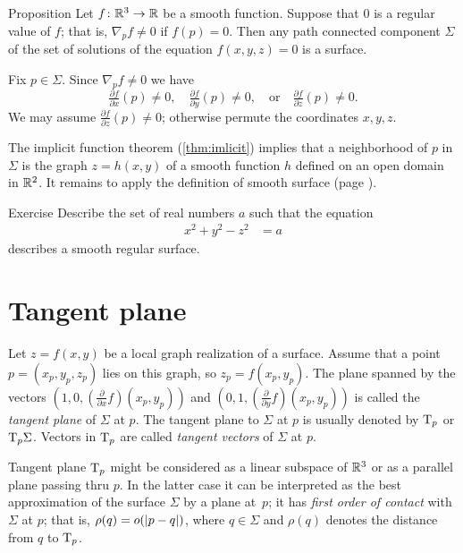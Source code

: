 \begin{thm}{Proposition}
Let $f\colon\mathbb{R}^3\to \mathbb{R}$ be a smooth function.
Suppose that $0$ is a regular value of $f$;
that is, $\nabla_p f\ne 0$ if $f(p)=0$.
Then any path connected component $\Sigma$ of the set of solutions of the equation $f(x,y,z)=0$ is a surface.
\end{thm}

Fix $p\in\Sigma$.
Since $\nabla_p f\ne 0$ we have 
\[\tfrac{\partial f}{\partial x}(p)\ne 0,\quad \tfrac{\partial f}{\partial y}(p)\ne 0,\quad \text{or}\quad\tfrac{\partial f}{\partial z}(p)\ne 0.\]
We may assume $\tfrac{\partial f}{\partial z}(p)\ne 0$;
otherwise permute the coordinates $x,y,z$.

The implicit function theorem (\ref{thm:imlicit}) implies that a neighborhood of $p$ in $\Sigma$ is the graph $z=h(x,y)$ of a smooth function $h$ defined on an open domain in $\mathbb{R}^2$.
It remains to apply the definition of smooth surface (page \pageref{page:def-smooth-surface}).
\qeds

\begin{thm}{Exercise}\label{ex:hyperboloinds}
Describe the set of real numbers $a$
such that the equation
\begin{align*}
x^2+y^2-z^2&=a
\end{align*}
describes a smooth regular surface.
\end{thm}

\section*{Tangent plane}

Let $z=f(x,y)$ be a local graph realization of a surface. 
Assume that a point $p=(x_p,y_p,z_p)$ lies on this graph, so $z_p=f(x_p,y_p)$.
The plane spanned by the vectors $(1,0,(\tfrac{\partial}{\partial x}f)(x_p,y_p))$ and  $(0,1,(\tfrac{\partial}{\partial y}f)(x_p,y_p))$ is called the \emph{tangent plane} of $\Sigma$ at $p$.
The tangent plane to $\Sigma$ at $p$ is usually denoted by $\mathrm{T}_p$ or $\mathrm{T}_p\Sigma$.
Vectors in $\mathrm{T}_p$ are called \emph{tangent vectors} of $\Sigma$ at $p$. %

Tangent plane $\mathrm{T}_p$ might be considered as a linear subspace of $\mathbb{R}^3$ or as a parallel plane passing thru $p$.
In the latter case it can be interpreted as the best approximation of the surface $\Sigma$ by a plane at~$p$;
it has \emph{first order of contact} with $\Sigma$ at $p$;
that is, $\rho(q)\z=o(|p-q|)$, where $q\in \Sigma$ and $\rho(q)$ denotes the distance from $q$ to $\mathrm{T}_p$.

